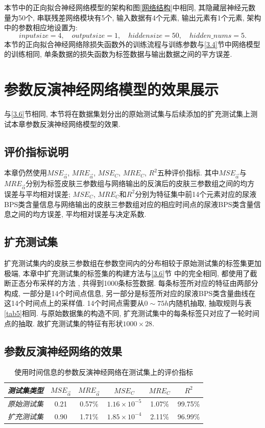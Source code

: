 \documentclass[a4paper,punct=banjiao,twoside]{ctexrep}
\theoremstyle{plain}
\theoremstyle{definition}
\theoremstyle{remark}
\begin{document}
本节中的正向拟合神经网络模型的架构和图\ref{网络结构}中相同, 其隐藏层神经元数量为50个, 串联残差网络模块有5个, 输入数据有4个元素, 输出元素有1个元素,
架构中的参数相应地设置为:
$$
inputsize = 4,\quad outputsize = 1,\quad hiddensize = 50, \quad hidden\_nums = 5.
$$
本节的正向拟合神经网络除损失函数外的训练流程与训练参数与\ref{3.4}节中网络模型的训练相同, 单条数据的损失函数为标签数据与输出数据之间的平方误差.

\section{参数反演神经网络模型的效果展示}

与\ref{3.6}节相同, 本节将在数据集划分出的原始测试集与后续添加的扩充测试集上测试本章参数反演神经网络模型的效果.

\subsection*{评价指标说明}

本章仍然使用$MSE_{\vec{\alpha}}$, $MRE_{\vec{\alpha}}$, $MSE_{C}$, $MRE_{C}$, $R^2$五种评价指标. 其中$MSE_{\vec{\alpha}}$与$MRE_{\vec{\alpha}}$分别为标签皮肤三参数组与网络输出的反演后的皮肤三参数组之间的均方误差与平均相对误差; 
$MSE_{C}$, $MRE_{C}$和$R^2$分别为特征集中前14个元素对应的尿液BPS类含量信息与网络输出的皮肤三参数组对应的相应时间点的尿液BPS类含量信息之间的均方误差, 平均相对误差与决定系数.

\subsection*{扩充测试集}

扩充测试集内的皮肤三参数组在参数空间内的分布相较于原始测试集的标签集更加极端, 本章中扩充测试集的标签集的构建方法与\ref{3.6}节
中的完全相同, 都使用了截断正态分布采样的方法 , 共得到1000条标签数据. 
每条标签所对应的特征由两部分构成, 一部分是14个时间点信息, 另一部分是标签所对应的尿液BPS类含量曲线在这14个时间点上的采样值.
14个时间点需要从$0\sim75h$内随机抽取, 抽取规则与表\ref{tab5}相同. 与原始数据集的构造不同, 扩充测试集中的每条标签只对应了一轮时间点的抽取. 故扩充测试集的特征有形状$1000\times 28$.

\subsection*{参数反演神经网络的效果}

\begin{table}[htbp]
  \centering
  \begin{tabular}[t]{l*{5}{c}}
    \hline
    \textit{测试集类型} &$MSE_{\vec{\alpha}}$&$MRE_{\vec{\alpha}}$ & $MSE_{C}$& $MRE_{C}$& $R^2$\\
    \hline
    \textit{原始测试集} &  0.21  &   0.57\%     &   $1.16\times 10^{-5}$     &  1.07\%     &  99.75\%  \\ 
    \textit{扩充测试集} &  0.90  &   1.71\%     &   $1.85\times 10^{-4}$     &  2.11\%     & 96.99\%  \\ 
    \hline
  \end{tabular}
  \caption{\label{tab7}使用时间信息的参数反演神经网络在测试集上的评价指标} 
\end{table}  
\end{document}

